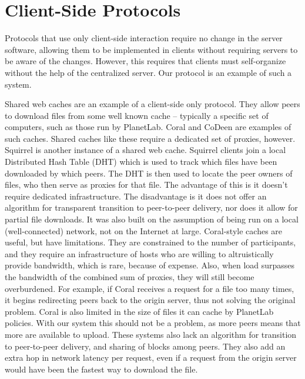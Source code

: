\section{Client-Side Protocols}
Protocols that use only client-side interaction require no change in the server software, allowing them to be implemented in clients without requiring servers to be aware of the changes.  However, this requires that clients must self-organize without the help of the centralized server.  Our protocol is an example of such a system.

Shared web caches are an example of a client-side only protocol.  They allow peers to download files from some well known cache -- typically a specific set of computers, such as those run by PlanetLab.  Coral \cite{coral} and CoDeen \cite{codeen} are examples of such caches.  Shared caches like these require a dedicated set of proxies, however.  
Squirrel \cite{squirrel} is another instance of a shared web cache.  Squirrel clients join a local Distributed Hash Table (DHT) 
which is used to track which files have been downloaded by which peers.  
The DHT is then used to locate the peer owners of files, who then serve as proxies for that file.  
The advantage of this is it doesn't require dedicated infrastructure.  
The disadvantage is it does not offer an algorithm for transparent transition to peer-to-peer delivery, nor does it allow for partial file downloads.  It was also built on the assumption of being run on a local (well-connected) network, not on the Internet at large.
Coral-style caches are useful, but have limitations.  They are constrained to the number of participants, and they require an infrastructure of hosts who are willing to altruistically provide bandwidth, which is rare, because of expense.  Also, when load surpasses the bandwidth of the 
combined sum of proxies, they will still become overburdened.  For example, if Coral receives a request for a file too many times, it begins redirecting peers back to the origin server, thus not solving the original problem.  
Coral is also limited in the size of files it can cache by PlanetLab policies.  With our system this should not be a problem, as more peers means that more are available to upload.  These systems also lack an algorithm for transition to peer-to-peer delivery, and sharing of blocks among peers.  They also add an extra hop in network latency per request, even if a request from the origin server would have been the fastest way to download the file.    

